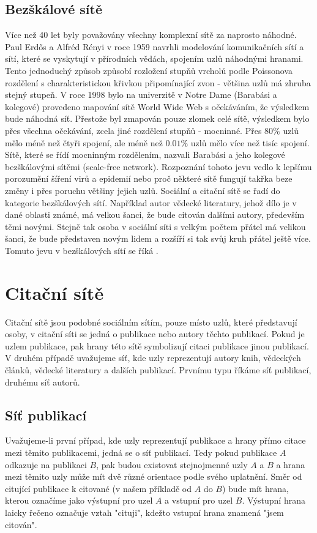 \documentclass[12pt,titlepage]{report}
\begin{document}
\subsection{Bezškálové sítě}
Více než 40 let byly považovány všechny komplexní sítě za naprosto náhodné.
Paul Erdős a Alfréd Rényi v roce 1959 navrhli modelování komunikačních sítí a
sítí, které se vyskytují v přírodních vědách, spojením uzlů náhodnými hranami.
Tento jednoduchý způsob způsobí rozložení stupňů vrcholů podle Poissonova
rozdělení s charakteristickou křivkou připomínající zvon - většina uzlů má
zhruba stejný stupeň. V roce 1998 bylo na univerzitě v Notre Dame (Barabási a
kolegové) provedeno mapování sítě World Wide Web s očekáváním, že výsledkem
bude náhodná síť. Přestože byl zmapován pouze zlomek celé sítě, výsledkem bylo
přes všechna očekávání, zcela jiné rozdělení stupňů - mocninné. Přes $80\%$
uzlů mělo méně než čtyři spojení, ale méně než $0.01\%$ uzlů mělo více než
tisíc spojení.
Sítě, které se řídí mocninným rozdělením, nazvali Barabási a jeho kolegové
bezškálovými sítěmi (scale-free network). Rozpoznání tohoto jevu vedlo k
lepšímu porozumění šíření virů a epidemií nebo proč některé sítě fungují takřka
beze změny i přes poruchu většiny jejich uzlů.
Sociální a citační sítě se řadí do kategorie bezškálových sítí. Například autor
vědecké literatury, jehož dílo je v dané oblasti známé, má velkou šanci, že
bude citován dalšími autory, především těmi novými. Stejně tak osoba v sociální
síti s velkým počtem přátel má velikou šanci, že bude představen novým lidem a
rozšíří si tak svůj kruh přátel ještě více. Tomuto jevu v bezškálových sítí se
říká .

\section{Citační sítě}
Citační sítě jsou podobné sociálním sítím, pouze místo uzlů, které představují
osoby, v citační síti se jedná o publikace nebo autory těchto publikací.  Pokud
je uzlem publikace, pak hrany této sítě symbolizují citaci publikace jinou
publikací. V druhém případě uvažujeme síť, kde uzly reprezentují autory knih,
vědeckých článků, vědecké literatury a dalších publikací. Prvnímu typu říkáme
síť publikací, druhému síť autorů.

\subsection{Síť publikací}
Uvažujeme-li první případ, kde uzly reprezentují publikace a hrany přímo citace
mezi těmito publikacemi, jedná se o síť publikací. Tedy pokud publikace $A$
odkazuje na publikaci $B$, pak budou existovat stejnojmenné uzly $A$ a $B$ a
hrana mezi těmito uzly může mít dvě různé orientace podle svého uplatnění. Směr
od citující publikace k citované (v našem příkladě od $A$ do $B$) bude mít
hrana, kterou označíme jako výstupní pro uzel $A$ a vstupní pro uzel $B$.
Výstupní hrana laicky řečeno označuje vztah "cituji", kdežto vstupní hrana
znamená "jsem citován".
\end{document}
